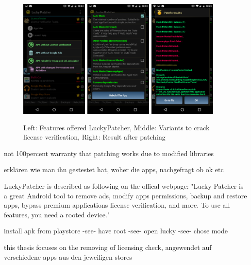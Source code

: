 \begin{figure}[h]
    \centering
    \includegraphics[width=0.3\textwidth]{data/luckyFeatures.png}
    \includegraphics[width=0.3\textwidth]{data/luckyModi.png}
    \includegraphics[width=0.3\textwidth]{data/luckyPatching.png}
    \caption{Left: Features offered LuckyPatcher, Middle: Variants to crack license verification, Right: Result after patching}
    \label{fig:luckyInapp}
\end{figure}

not 100percent warranty that patching works due to modified libraries


erklären wie man ihn gestestet hat, woher die apps, nachgefragt ob ok etc

LuckyPatcher is described as following on the offical webpage: "Lucky Patcher is a great Android tool to remove ads, modify apps permissions, backup and restore apps, bypass premium applications license verification, and more. To use all features, you need a rooted device." \cite{luckyPatcherOfficial}

install apk from playstore -see- have root -see- open lucky -see- chose mode


this thesis focuses on the removing of licensing check, angewendet auf verschiedene apps aus den jeweiligen stores
